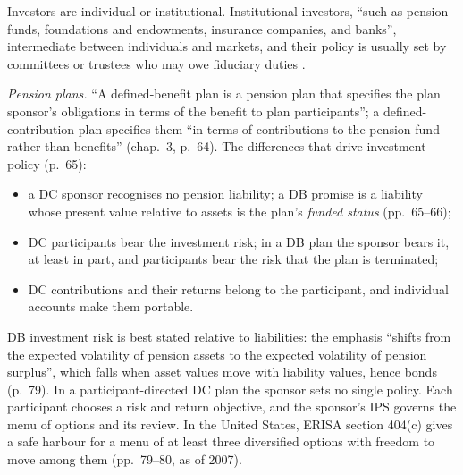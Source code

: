 \begin{qfdefinition}\label{def:investor-types-needs}
 Investors are individual or institutional. Institutional investors, ``such as pension funds, foundations and endowments, insurance companies, and banks'', intermediate between individuals and markets, and their policy is usually set by committees or trustees who may owe fiduciary duties \citep[chap.~1, p.~3]{managing-investment-portfolios-2007}.

\emph{Pension plans.} ``A defined-benefit plan is a pension plan that specifies the plan sponsor's obligations in terms of the benefit to plan participants''; a defined-contribution plan specifies them ``in terms of contributions to the pension fund rather than benefits'' (chap.~3, p.~64). The differences that drive investment policy (p.~65):
\begin{itemize}
\item a DC sponsor recognises no pension liability; a DB promise is a liability whose present value relative to assets is the plan's \emph{funded status} (pp.~65--66);
\item DC participants bear the investment risk; in a DB plan the sponsor bears it, at least in part, and participants bear the risk that the plan is terminated;
\item DC contributions and their returns belong to the participant, and individual accounts make them portable.
\end{itemize}
DB investment risk is best stated relative to liabilities: the emphasis ``shifts from the expected volatility of pension assets to the expected volatility of pension surplus'', which falls when asset values move with liability values, hence bonds (p.~79). In a participant-directed DC plan the sponsor sets no single policy. Each participant chooses a risk and return objective, and the sponsor's IPS governs the menu of options and its review. In the United States, ERISA section 404(c) gives a safe harbour for a menu of at least three diversified options with freedom to move among them (pp.~79--80, as of 2007).


\end{qfdefinition}
